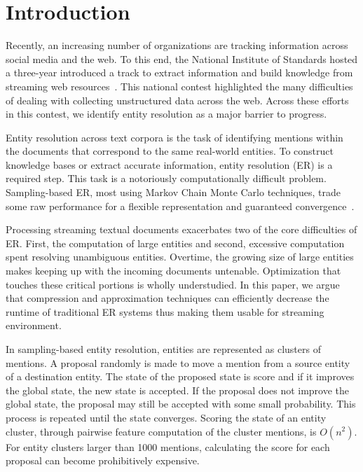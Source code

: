 
\section{Introduction}

Recently, an increasing number of organizations are tracking information across
social media and the web.
To this end, the National Institute of Standards hosted a three-year
introduced a track to extract information and build knowledge from streaming web
resources~\cite{frank2013evaluating}.
This national contest highlighted the many difficulties of dealing with collecting 
unstructured data across the web.
Across these efforts in this contest, we identify entity resolution as a major barrier to progress. 


Entity resolution across text corpora is the task of identifying mentions 
within the documents that correspond to the same real-world entities.
To construct knowledge bases or extract accurate information, entity resolution (ER) is a required step.
This task is a notoriously computationally difficult problem.
Sampling-based ER, most using Markov Chain Monte Carlo techniques, trade some raw performance for a flexible representation 
and guaranteed convergence~\cite{mccallum03towardconditional,singh2011large,wick2013discriminative}.

Processing streaming textual documents exacerbates two of the core difficulties of ER.\@
First, the computation of large entities and second, excessive
computation spent resolving unambiguous entities.
Overtime, the growing size of large entities makes keeping up with the incoming documents untenable.
Optimization that touches these critical portions is wholly understudied.
In this paper, we argue that compression and approximation 
techniques can efficiently decrease the runtime of traditional ER systems thus
making them usable for streaming environment.

In sampling-based entity resolution, entities are represented as clusters of mentions.
A proposal randomly is made to move a mention from a source entity of a destination entity.
The state of the proposed state is score and if it improves the global state, the new state is accepted.
If the proposal does not improve the global state, the proposal may still be accepted with some small probability.
This process is repeated until the state converges.
Scoring the state of an entity cluster, through pairwise feature computation of the cluster mentions, is $O(n^2)$.
For entity clusters larger than 1000 mentions, calculating the score for each proposal can become prohibitively expensive.

